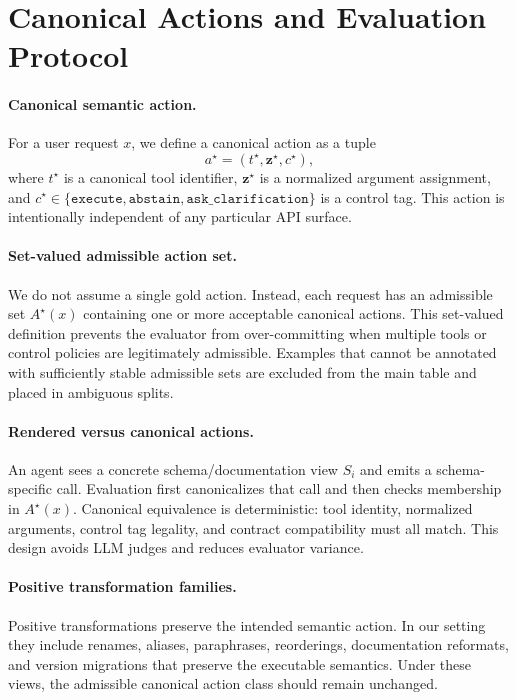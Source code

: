 \section{Canonical Actions and Evaluation Protocol}
\label{sec:protocol}

\paragraph{Canonical semantic action.}
For a user request $x$, we define a canonical action as a tuple
\[
a^\star = (t^\star, \mathbf{z}^\star, c^\star),
\]
where $t^\star$ is a canonical tool identifier, $\mathbf{z}^\star$ is a normalized argument assignment, and $c^\star \in \{\texttt{execute}, \texttt{abstain}, \texttt{ask\_clarification}\}$ is a control tag. This action is intentionally independent of any particular API surface.

\paragraph{Set-valued admissible action set.}
We do not assume a single gold action. Instead, each request has an admissible set $A^\star(x)$ containing one or more acceptable canonical actions. This set-valued definition prevents the evaluator from over-committing when multiple tools or control policies are legitimately admissible. Examples that cannot be annotated with sufficiently stable admissible sets are excluded from the main table and placed in ambiguous splits.

\paragraph{Rendered versus canonical actions.}
An agent sees a concrete schema/documentation view $S_i$ and emits a schema-specific call. Evaluation first canonicalizes that call and then checks membership in $A^\star(x)$. Canonical equivalence is deterministic: tool identity, normalized arguments, control tag legality, and contract compatibility must all match. This design avoids LLM judges and reduces evaluator variance.

\paragraph{Positive transformation families.}
Positive transformations preserve the intended semantic action. In our setting they include renames, aliases, paraphrases, reorderings, documentation reformats, and version migrations that preserve the executable semantics. Under these views, the admissible canonical action class should remain unchanged.

